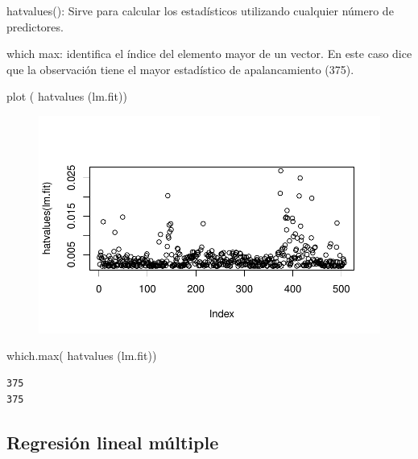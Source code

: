 \documentclass[
  letterpaper,
  DIV=11,
  numbers=noendperiod]{scrartcl}
\newenvironment{Shaded}{\begin{snugshade}}{\end{snugshade}}
\newcommand{\FunctionTok}[1]{\textcolor[rgb]{0.28,0.35,0.67}{#1}}
\newcommand{\NormalTok}[1]{\textcolor[rgb]{0.00,0.23,0.31}{#1}}
\begin{document}
hatvalues(): Sirve para calcular los estadísticos utilizando cualquier
número de predictores.

which max: identifica el índice del elemento mayor de un vector. En este
caso dice que la observación tiene el mayor estadístico de
apalancamiento (375).

\begin{Shaded}
\begin{Highlighting}[]
\FunctionTok{plot}\NormalTok{ ( }\FunctionTok{hatvalues}\NormalTok{ (lm.fit))}
\end{Highlighting}
\end{Shaded}

\begin{figure}[H]

{\centering \includegraphics{Resumen-2---3_files/figure-pdf/unnamed-chunk-12-1.pdf}

}

\end{figure}

\begin{Shaded}
\begin{Highlighting}[]
\FunctionTok{which.max}\NormalTok{( }\FunctionTok{hatvalues}\NormalTok{ (lm.fit))}
\end{Highlighting}
\end{Shaded}

\begin{verbatim}
375 
375 
\end{verbatim}

\hypertarget{regresiuxf3n-lineal-muxfaltiple-1}{%
\subsection{Regresión lineal
múltiple}\label{regresiuxf3n-lineal-muxfaltiple-1}}
\end{document}
